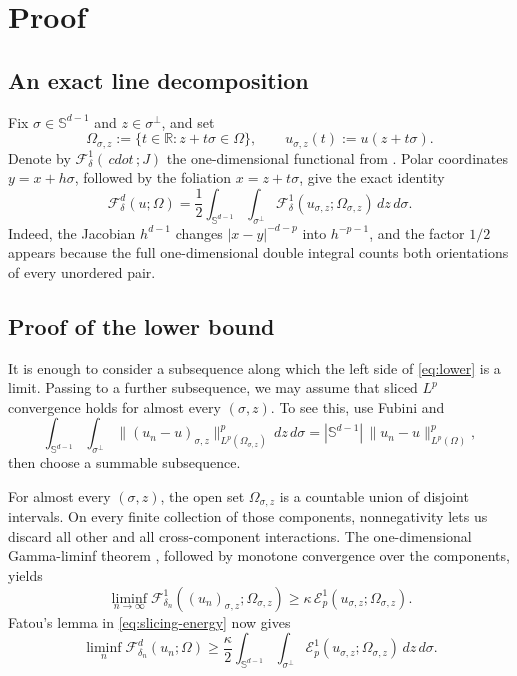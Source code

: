 \documentclass[11pt]{article}
\newcommand{\R}{\mathbb R}
\newcommand{\Sph}{\mathbb S}
\newcommand{\F}{\mathcal F}
\newcommand{\E}{\mathcal E}
\begin{document}
\section{Proof}

\subsection{An exact line decomposition}

Fix $\sigma\in\Sph^{d-1}$ and $z\in\sigma^\perp$, and set
\[
 \Omega_{\sigma,z}:=\{t\in\R:z+t\sigma\in\Omega\},\qquad
 u_{\sigma,z}(t):=u(z+t\sigma).
\]
Denote by $\F^1_\delta(\,cdot\,;J)$ the one-dimensional functional from
\cite{BN1D}.  Polar coordinates $y=x+h\sigma$, followed by the foliation
$x=z+t\sigma$, give the exact identity
\begin{equation}\label{eq:slicing-energy}
 \F^d_\delta(u;\Omega)
 =\frac12\int_{\Sph^{d-1}}\int_{\sigma^\perp}
 \F^1_\delta(u_{\sigma,z};\Omega_{\sigma,z})\,dz\,d\sigma.
\end{equation}
Indeed, the Jacobian $h^{d-1}$ changes $|x-y|^{-d-p}$ into
$h^{-p-1}$, and the factor $1/2$ appears because the full one-dimensional
double integral counts both orientations of every unordered pair.

\subsection{Proof of the lower bound}

It is enough to consider a subsequence along which the left side of
\eqref{eq:lower} is a limit.  Passing to a further subsequence, we may assume
that sliced $L^p$ convergence holds for almost every $(\sigma,z)$.  To see
this, use Fubini and
\begin{equation}\label{eq:slice-lp}
 \int_{\Sph^{d-1}}\int_{\sigma^\perp}
 \|(u_n-u)_{\sigma,z}\|_{L^p(\Omega_{\sigma,z})}^p\,dz\,d\sigma
 =|\Sph^{d-1}|\,\|u_n-u\|_{L^p(\Omega)}^p,
\end{equation}
then choose a summable subsequence.

For almost every $(\sigma,z)$, the open set $\Omega_{\sigma,z}$ is a
countable union of disjoint intervals.  On every finite collection of those
components, nonnegativity lets us discard all other and all cross-component
interactions.  The one-dimensional Gamma-liminf theorem
\cite[Theorem 1.1]{BN1D}, followed by monotone convergence over the
components, yields
\begin{equation}\label{eq:line-lower}
 \liminf_{n\to\infty}
 \F^1_{\delta_n}((u_n)_{\sigma,z};\Omega_{\sigma,z})
 \geq \kappa\,\E_p^1(u_{\sigma,z};\Omega_{\sigma,z}).
\end{equation}
Fatou's lemma in \eqref{eq:slicing-energy} now gives
\begin{equation}\label{eq:dir-lower}
 \liminf_n\F^d_{\delta_n}(u_n;\Omega)
 \geq\frac\kappa2\int_{\Sph^{d-1}}\int_{\sigma^\perp}
 \E_p^1(u_{\sigma,z};\Omega_{\sigma,z})\,dz\,d\sigma.
\end{equation}
\end{document}
